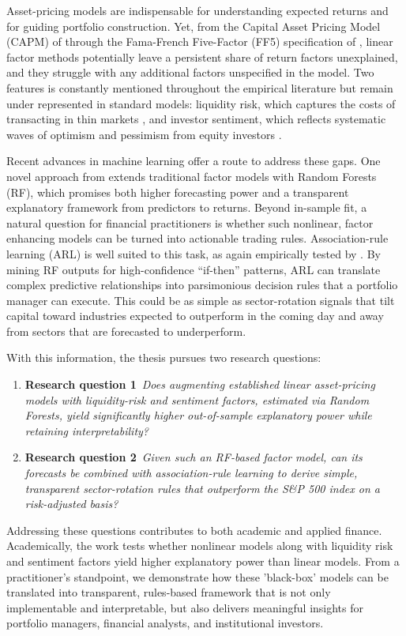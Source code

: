 Asset-pricing models are indispensable for understanding expected returns and for guiding portfolio construction. Yet, from the Capital Asset Pricing Model (CAPM) of  through the Fama-French Five-Factor (FF5) specification of , linear factor methods potentially leave a persistent share of return factors unexplained, and they struggle with any additional factors unspecified in the model. Two features is constantly mentioned throughout the empirical literature but remain under represented in standard models: liquidity risk, which captures the costs of transacting in thin markets \cite{pastor_2003,acharya_2005}, and investor sentiment, which reflects systematic waves of optimism and pessimism from equity investors \cite{baker_wurgler_2006}.

Recent advances in machine learning offer a route to address these gaps. One novel approach from  extends traditional factor models with Random Forests (RF), which promises both higher forecasting power and a transparent explanatory framework from predictors to returns. Beyond in-sample fit, a natural question for financial practitioners is whether such nonlinear, factor enhancing models can be turned into actionable trading rules. Association-rule learning (ARL) is well suited to this task, as again empirically tested by . By mining RF outputs for high-confidence “if-then” patterns, ARL can translate complex predictive relationships into parsimonious decision rules that a portfolio manager can execute. This could be as simple as sector-rotation signals that tilt capital toward industries expected to outperform in the coming day and away from sectors that are forecasted to underperform.

\bigskip
\noindent
With this information, the thesis pursues two research questions:

\begin{enumerate}
\item \textbf{Research question 1}\
\textit{Does augmenting established linear asset-pricing models with liquidity-risk and sentiment factors, estimated via Random Forests, yield significantly higher out-of-sample explanatory power while retaining interpretability?}
\item \textbf{Research question 2}\
\textit{Given such an RF-based factor model, can its forecasts be combined with association-rule learning to derive simple, transparent sector-rotation rules that outperform the S\&P 500 index on a risk-adjusted basis?}
\end{enumerate}

Addressing these questions contributes to both academic and applied finance. Academically, the work tests whether nonlinear models along with liquidity risk and sentiment factors yield higher explanatory power than linear models. From a practitioner's standpoint, we demonstrate how these 'black-box' models can be translated into transparent, rules-based framework that is not only implementable and interpretable, but also delivers meaningful insights for portfolio managers, financial analysts, and institutional investors. 